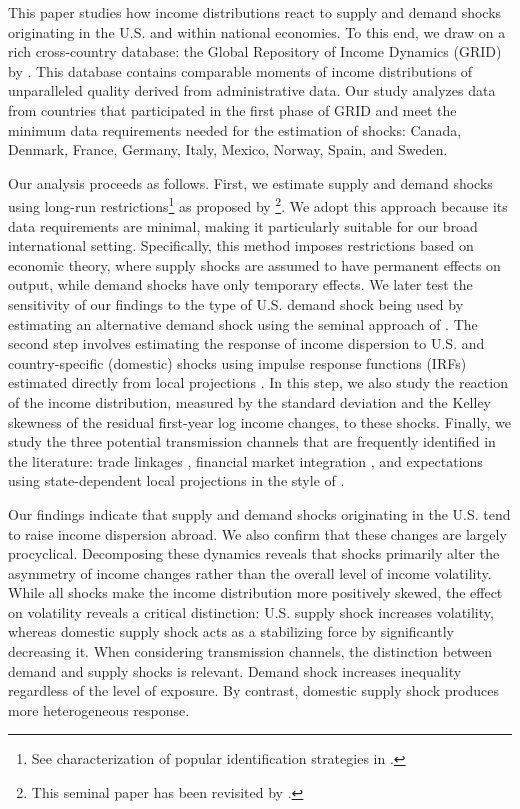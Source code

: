 \documentclass[12pt, a4paper]{article}
\begin{document}
This paper studies how income distributions react to supply and demand shocks originating in the U.S. and within national economies. To this end, we draw on a rich cross-country database: the Global Repository of Income Dynamics (GRID) by \textcite{guvenen2022global}. This database contains comparable moments of income distributions of unparalleled quality derived from administrative data. Our study analyzes data from countries that participated in the first phase of GRID and meet the minimum data requirements needed for the estimation of shocks: Canada, Denmark, France, Germany, Italy, Mexico, Norway, Spain, and Sweden.

Our analysis proceeds as follows. First, we estimate supply and demand shocks using long-run restrictions\footnote{See characterization of popular identification strategies in \textcite{ramey2016macroeconomic}.} as proposed by \textcite{blanchard1989dynamic}\footnote{This seminal paper has been revisited by \textcite{Binet2015, Herwartz2018, Keating2013}.}. We adopt this approach because its data requirements are minimal, making it particularly suitable for our broad international setting. Specifically, this method imposes restrictions based on economic theory, where supply shocks are assumed to have permanent effects on output, while demand shocks have only temporary effects. We later test the sensitivity of our findings to the type of U.S. demand shock being used by estimating an alternative demand shock using the seminal approach of \textcite{bayoumi1992shocking}. The second step involves estimating the response of income dispersion to U.S. and country-specific (domestic) shocks using impulse response functions (IRFs) estimated directly from local projections \parencite{jorda2005estimation, jorda2024local}. In this step, we also study the reaction of the income distribution, measured by the standard deviation and the Kelley skewness of the residual first-year log income changes, to these shocks. Finally, we study the three potential transmission channels that are frequently identified in the literature: trade linkages \parencite{corsetti2011multilateral}, financial market integration \parencite{faccini2016international}, and expectations \parencite{klein2021real} using state-dependent local projections in the style of \textcite{auerbach2013output}.

Our findings indicate that supply and demand shocks originating in the U.S. tend to raise income dispersion abroad. We also confirm that these changes are largely procyclical. Decomposing these dynamics reveals that shocks primarily alter the asymmetry of income changes rather than the overall level of income volatility. While all shocks make the income distribution more positively skewed, the effect on volatility reveals a critical distinction: U.S. supply shock increases volatility, whereas domestic supply shock acts as a stabilizing force by significantly decreasing it. When considering transmission channels, the distinction between demand and supply shocks is relevant. Demand shock increases inequality regardless of the level of exposure. By contrast, domestic supply shock produces more heterogeneous response.
\end{document}
